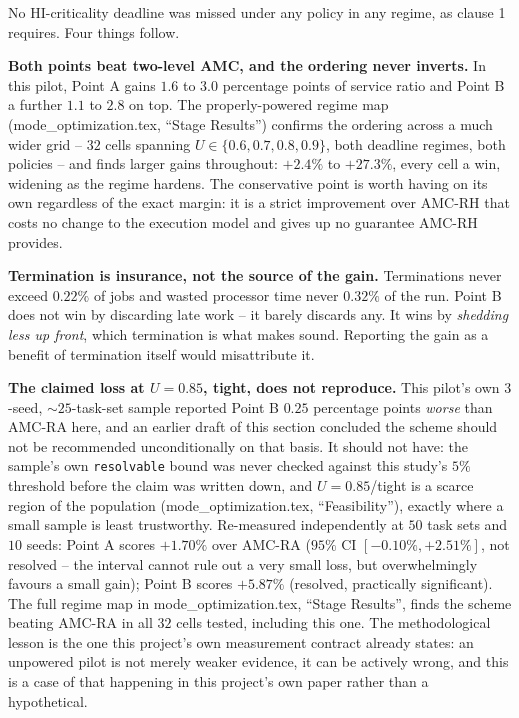 \documentclass{article}
\begin{document}
\noindent No HI-criticality deadline was missed under any policy in any regime,
as clause 1 requires. Four things follow.

\textbf{Both points beat two-level AMC, and the ordering never inverts.} In
this pilot, Point A gains $1.6$ to $3.0$ percentage points of service ratio and
Point B a further $1.1$ to $2.8$ on top. The properly-powered regime map
(mode\_optimization.tex, ``Stage Results'') confirms the ordering across a much
wider grid -- $32$ cells spanning $U \in \{0.6, 0.7, 0.8, 0.9\}$, both deadline
regimes, both policies -- and finds larger gains throughout: $+2.4\%$ to
$+27.3\%$, every cell a win, widening as the regime hardens. The conservative
point is worth having on its own regardless of the exact margin: it is a strict
improvement over AMC-RH that costs no change to the execution model and gives
up no guarantee AMC-RH provides.

\textbf{Termination is insurance, not the source of the gain.} Terminations
never exceed $0.22\%$ of jobs and wasted processor time never $0.32\%$ of the
run. Point B does not win by discarding late work -- it barely discards any. It
wins by \emph{shedding less up front}, which termination is what makes sound.
Reporting the gain as a benefit of termination itself would misattribute it.

\textbf{The claimed loss at $U=0.85$, tight, does not reproduce.} This pilot's
own $3$-seed, $\sim\!25$-task-set sample reported Point B $0.25$ percentage
points \emph{worse} than AMC-RA here, and an earlier draft of this section
concluded the scheme should not be recommended unconditionally on that basis.
It should not have: the sample's own \texttt{resolvable} bound was never
checked against this study's $5\%$ threshold before the claim was written down,
and $U=0.85$/tight is a scarce region of the population
(mode\_optimization.tex, ``Feasibility''), exactly where a small sample is least
trustworthy. Re-measured independently at $50$ task sets and $10$ seeds: Point
A scores $+1.70\%$ over AMC-RA ($95\%$ CI $[-0.10\%, +2.51\%]$, not resolved --
the interval cannot rule out a very small loss, but overwhelmingly favours a
small gain); Point B scores $+5.87\%$ (resolved, practically significant). The
full regime map in mode\_optimization.tex, ``Stage Results'', finds the scheme
beating AMC-RA in all $32$ cells tested, including this one. The
methodological lesson is the one this project's own measurement contract
already states: an unpowered pilot is not merely weaker evidence, it can be
actively wrong, and this is a case of that happening in this project's own
paper rather than a hypothetical.
\end{document}
